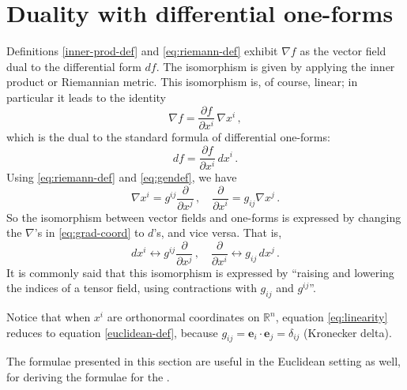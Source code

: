 \documentclass{article}
\newcommand{\real}{\mathbb{R}}
\newcommand{\ve}{\mathbf{e}}
\begin{document}
\section{Duality with differential one-forms}
Definitions \eqref{inner-prod-def} and \eqref{eq:riemann-def}
exhibit $\nabla f$ as the vector field
dual to the differential form $df$.
The isomorphism is given by applying the inner product or Riemannian metric.
This isomorphism is, of course, linear;
in particular it leads to the identity
\begin{equation}\label{eq:linearity}
\nabla f = \frac{\partial f}{\partial x^i} \, \nabla x^i\,, 
\end{equation}
which is the dual to the standard formula of differential one-forms:
\[
df = \frac{\partial f}{\partial x^i} \, dx^i \,.
\]
Using \eqref{eq:riemann-def} and \eqref{eq:gendef},
we have
\begin{equation}\label{eq:grad-coord}
\nabla x^i = g^{ij} \frac{\partial}{\partial x^j} \,, \quad
\frac{\partial}{\partial x^i} = g_{ij} \nabla x^j\,.
\end{equation}
So the isomorphism between vector fields and one-forms
is expressed by changing
the $\nabla$'s in \eqref{eq:grad-coord} to $d$'s, and vice versa.  That is,
\begin{equation}
d x^i \leftrightarrow g^{ij}  \frac{\partial}{\partial x^j} \,, \quad
\frac{\partial}{\partial x^i} \leftrightarrow g_{ij} \, d x^j\,.
\end{equation}
It is commonly said that this isomorphism is expressed by 
``raising and lowering the indices of a tensor field,
using contractions with $g_{ij}$ and $g^{ij}$''.

\smallskip

Notice that when $x^i$ are orthonormal coordinates
on $\real^n$, equation \eqref{eq:linearity}
reduces to equation \eqref{euclidean-def}, because
$g_{ij} = \ve_i \cdot \ve_j = \delta_{ij}$ (Kronecker delta).

The formulae presented in this section are useful in the Euclidean setting as
well, for deriving the formulae for the .



\end{document}
